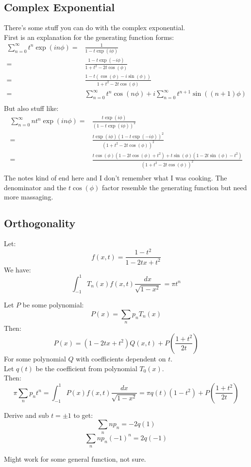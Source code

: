 \subsection{Complex Exponential}
There's some stuff you can do with the complex exponential.
\\
First is an explanation for the generating function forms:
\begin{equation*}
\begin{aligned}
	\sum_{n=0}^\infty t^n\exp(in\phi) 
	=&\frac{1}{1-t\exp(i\phi)} \\
	=&\frac{1-t\exp(-i\phi)}{1+t^2-2t\cos(\phi)} \\
	=&\frac{1-t(\cos(\phi)-i\sin(\phi))}{1+t^2-2t\cos(\phi)} \\
	=&\sum_{n=0}^\infty t^n\cos(n\phi)+i\sum_{n=0}^\infty t^{n+1}\sin((n+1)\phi)\\ 
\end{aligned}
\end{equation*}
But also stuff like:
\begin{equation*}
\begin{aligned}
	\sum_{n=0}^{\infty}nt^n\exp(in\phi) 
	=& \frac{t\exp(i\phi)}{(1-t\exp(i\phi))^2}\\
	=& \frac{t\exp(i\phi)(1-t\exp(-i\phi))^2}{(1+t^2-2t\cos(\phi))^2} \\
	=& \frac{t\cos(\phi)(1-2t\cos(\phi)+t^2)+t\sin(\phi)(1-2t\sin(\phi)-t^2)}{(1+t^2-2t\cos(\phi))^2} \\
\end{aligned}
\end{equation*}
The notes kind of end here and I don't remember what I was cooking.
The denominator and the $t\cos(\phi)$ factor resemble the generating function but need more massaging.

\subsection{Orthogonality}

Let:
\[f(x,t) = \frac{1-t^2}{1-2tx+t^2} \]
We have:
\[\int_{-1}^1T_n(x)f(x,t)\frac{dx}{\sqrt{1-x^2}}\ = \pi t^n \]

Let $P$ be some polynomial:
\[ P(x) = \sum_{n}p_nT_n(x) \]
Then:
\[ P(x) = (1-2tx+t^2)Q(x,t)+P\left(\frac{1+t^2}{2t}\right) \]
For some polynomial $Q$ with coefficients dependent on $t$.
\\
Let $q(t)$ be the coefficient from polynomial $T_0(x)$.
\\
Then:
\[\pi\sum_np_nt^n = \int_{-1}^1P(x)f(x,t)\frac{dx}{\sqrt{1-x^2}} = \pi q(t)(1-t^2) + P\left(\frac{1+t^2}{2t}\right) \]

Derive and sub $t=\pm1$ to get:
\[\sum_nnp_n = -2q(1)\]
\[\sum_nnp_n(-1)^n = 2q(-1)\]

Might work for some general function, not sure.
